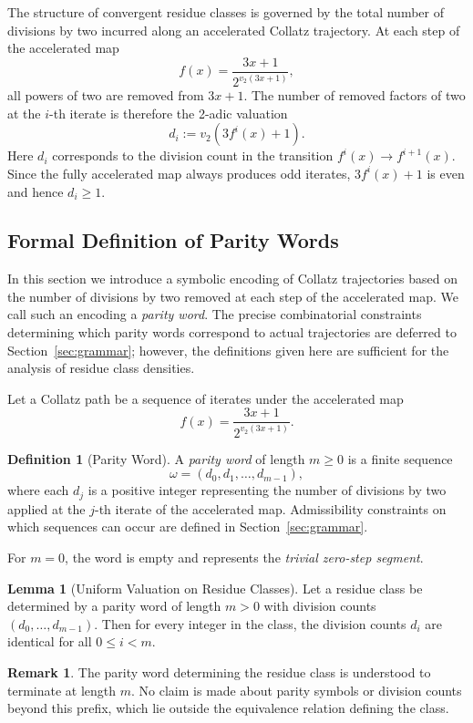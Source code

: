 \documentclass[12pt, oneside]{article}   	%
\numberwithin{equation}{section}          %
\theoremstyle{definition}
\newtheorem{define}{Definition}[section]
\newtheorem{lemma}[theorem]{Lemma}
\newtheorem*{remark}{Remark}
\begin{document}
The structure of convergent residue classes is governed by the total number of divisions
by two incurred along an accelerated Collatz trajectory. At each step of the accelerated map
\[
f(x) = \frac{3x+1}{2^{v_2(3x+1)}},
\]
all powers of two are removed from \(3x+1\). The number of removed factors of two at the
\(i\)-th iterate is therefore the 2-adic valuation
\[
d_i := v_2(3 f^i(x) + 1).
\]
Here $d_i$ corresponds to the division count in the transition $f^i(x) \rightarrow f^{i+1}(x)$.
Since the fully accelerated map always produces odd iterates, $3 f^i(x) + 1$ is even and hence
$d_i \ge 1$. 


\subsection{Formal Definition of Parity Words}

In this section we introduce a symbolic encoding of Collatz trajectories
based on the number of divisions by two removed at each step of the accelerated map.
We call such an encoding a \emph{parity word}. The precise combinatorial
constraints determining which parity words correspond to actual trajectories
are deferred to Section~\ref{sec:grammar}; however, the definitions
given here are sufficient for the analysis of residue class densities.

Let a Collatz path be a sequence of iterates under the accelerated map
\[
f(x) = \frac{3x+1}{2^{v_2(3x+1)}}.
\]

\begin{define}[Parity Word]
A \emph{parity word} of length $m \ge 0$ is a finite sequence
\[
\omega = (d_0, d_1, \dots, d_{m-1}),
\]
where each $d_j$ is a positive integer representing the number of divisions
by two applied at the $j$-th iterate of the accelerated map.  Admissibility
constraints on which sequences can occur are defined in Section~\ref{sec:grammar}.

For $m=0$, the word is empty and represents the \emph{trivial zero-step segment}.
\end{define}

\begin{lemma}[Uniform Valuation on Residue Classes]
Let a residue class be determined by a parity word of length $m > 0$ with division counts
$(d_0,\dots,d_{m-1})$.  
Then for every integer in the class, the division counts $d_i$ are identical for
all $0 \le i < m$.
\end{lemma}

\begin{remark}
The parity word determining the residue class is understood to terminate at length $m$.
No claim is made about parity symbols or division counts beyond this prefix, which lie
outside the equivalence relation defining the class.
\end{remark}
\end{document}
